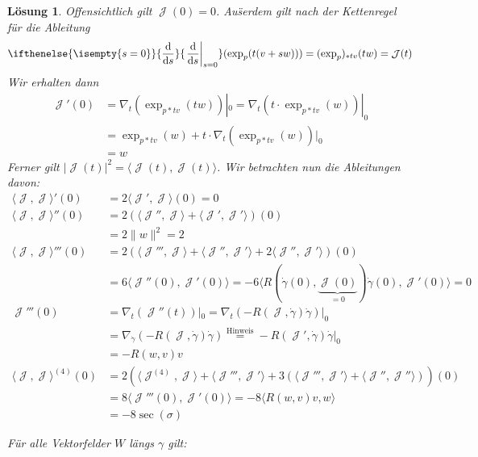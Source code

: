 \documentclass[paper=A4, twoside, chapterprefix=true, bibliography=totoc, headsepline]{scrbook}
\DeclareMathOperator{\calJ}{\mathcal{J}}
\newcommand{\dop}{\mathrm{d}}
\newcommand{\difffrac}[3][]{\ifthenelse{\isempty{#1}}{\frac{\dop #2}{\dop #3}}{\left. \frac{\dop #2}{\dop #3} \right|_{#1}}}
\theoremstyle{plain}
\theoremstyle{nonumberplain}
\theoremstyle{empty}
\theoremstyle{break}
\newtheorem{Loes}{L\"osung}
\begin{document}
\begin{Loes}
Offensichtlich gilt $\calJ(0) = 0$.
Au\"serdem gilt nach der Kettenregel f\"ur die Ableitung
\begin{align*}
\difffrac[s=0]{}{s} (\exp_p(t(v+sw))) = (\exp_p)_{*tv}(tw) = \calJ(t)
\end{align*}
Wir erhalten dann
\begin{align*}
	\calJ'(0) &= \nabla_t (\exp_{p*tv}(tw))|_0 = \nabla_t (t \cdot \exp_{p*tv}(w))|_0 \\
	&= \exp_{p*tv}(w) + t \cdot \nabla_t (\exp_{p*tv}(w))|_0 \\
	&= w
\end{align*}
Ferner gilt $|\calJ(t)|^2 = \langle \calJ(t), \calJ(t) \rangle$. Wir betrachten nun die Ableitungen davon:
\begin{align*}
	\langle \calJ, \calJ \rangle' (0) &= 2 \langle \calJ', \calJ \rangle (0) = 0 \\
	\langle \calJ, \calJ \rangle'' (0) &= 2 \left( \langle \calJ'', \calJ \rangle + \langle \calJ', \calJ' \rangle \right) (0) \\
	&= 2 \|w\|^2 = 2 \\
	\langle \calJ, \calJ \rangle''' (0) &= 2 \left( \langle \calJ''', \calJ \rangle + \langle \calJ'', \calJ' \rangle + 2 \langle \calJ'', \calJ' \rangle \right) (0) \\
	&= 6 \langle \calJ''(0), \calJ'(0) \rangle = -6 \langle R(\dot\gamma(0), \underbrace{\calJ(0)}_{=0}) \dot\gamma(0), \calJ'(0) \rangle = 0 \\
	\calJ'''(0) &= \nabla_t(\calJ''(t))|_0 = \nabla_t (-R(\calJ, \dot\gamma) \dot\gamma)|_0 \\
	&= \nabla_{\dot\gamma} (-R(\calJ, \dot\gamma) \dot\gamma) \overset{\text{Hinweis}}{=} -R(\calJ', \dot\gamma) \dot\gamma|_0 \\
	&= -R(w,v) v \\
	\langle \calJ, \calJ \rangle^{(4)}(0) &= 2 \left( \langle \calJ^{(4)}, \calJ \rangle + \langle \calJ''', \calJ' \rangle + 3 \left( \langle \calJ''', \calJ' \rangle + \langle \calJ'', \calJ'' \rangle \right) \right) (0) \\
	&= 8 \langle \calJ'''(0), \calJ'(0) \rangle = -8 \langle R(w, v) v, w \rangle \\
	&= -8 \sec(\sigma)
\end{align*}
\begin{description}[leftmargin=*]\item[Beweis des Hinweises]
F\"ur alle Vektorfelder $W$ l\"angs $\gamma$ gilt:
\begin{align*}

\end{align*}
\end{description}
\end{Loes}
\end{document}
